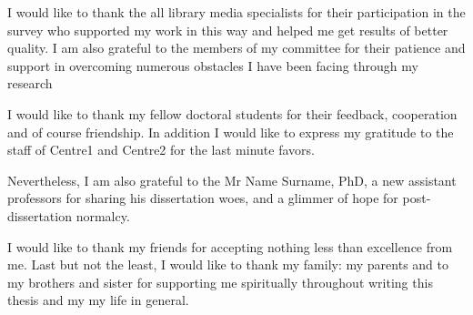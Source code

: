 \begin{acknowledgements}
I would like to thank the all library media specialists for their participation in the survey who supported my work in this way and helped me get results of better quality. I am also grateful to the members of my committee for their patience and support in overcoming numerous obstacles I have been facing through my research

I would like to thank my fellow doctoral students for their feedback, cooperation and of course friendship. In addition I would like to express my gratitude to the staff of Centre1 and Centre2 for  the last minute favors.

Nevertheless, I am also grateful to the Mr Name Surname, PhD, a new assistant professors for sharing his dissertation woes, and a glimmer of hope for post-dissertation normalcy.

I would like to thank my friends for accepting nothing less than excellence from me. Last but not the least, I would like to thank my family: my parents and to my brothers and sister for supporting me spiritually throughout writing this thesis and my my life in general.
\end{acknowledgements}